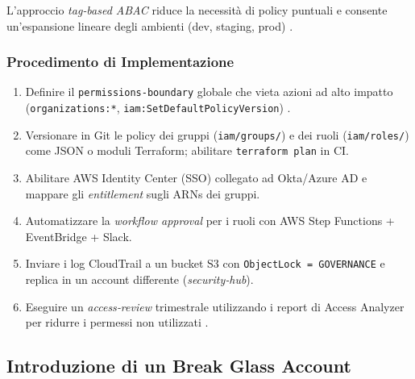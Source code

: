 L'approccio \emph{tag‑based ABAC} riduce la necessità di policy
puntuali e consente un'espansione lineare degli ambienti (dev, staging,
prod) \cite{AWSEC2IAM,AWSELBIAM}.


\subsubsection{Procedimento di Implementazione}
\label{subsubsec:procedura}

\begin{enumerate}
  \item Definire il \texttt{permissions‑boundary} globale che vieta azioni
        ad alto impatto (\texttt{organizations:*}, \texttt{iam:SetDefaultPolicyVersion}) \cite{AWSPermBoundaries}.  
  \item Versionare in Git le policy dei gruppi (\verb|iam/groups/|) e dei
        ruoli (\verb|iam/roles/|) come JSON o
        moduli Terraform; abilitare \verb|terraform plan| in CI.  
  \item Abilitare AWS Identity Center (SSO) collegato ad Okta/Azure AD e
        mappare gli \emph{entitlement} sugli ARNs dei gruppi.  
  \item Automatizzare la \emph{workflow approval} per i ruoli con AWS Step
        Functions + EventBridge + Slack.  
  \item Inviare i log CloudTrail a un bucket S3 con
        \texttt{ObjectLock = GOVERNANCE} e replica in un account
        differente (\textit{security‑hub}).  
  \item Eseguire un \emph{access‑review} trimestrale utilizzando i report
        di Access Analyzer per ridurre i permessi non utilizzati \cite{DatadogLeastPrivilege}.  
\end{enumerate}


\subsection{Introduzione di un Break Glass Account}

